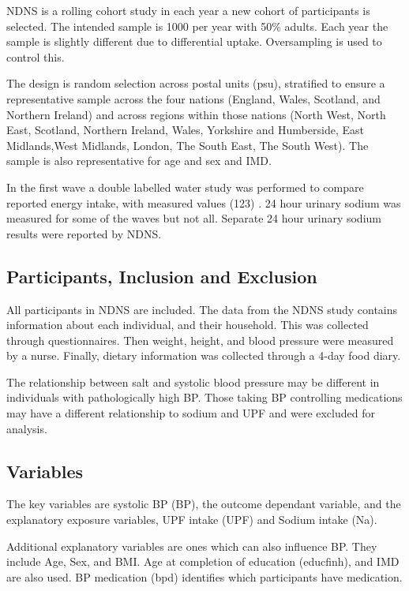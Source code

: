\documentclass[
]{article}
\begin{document}
NDNS is a rolling cohort study in each year a new cohort of participants
is selected. The intended sample is 1000 per year with 50\% adults. Each
year the sample is slightly different due to differential uptake.
Oversampling is used to control this.

The design is random selection across postal units (psu), stratified to
ensure a representative sample across the four nations (England, Wales,
Scotland, and Northern Ireland) and across regions within those nations
(North West, North East, Scotland, Northern Ireland, Wales, Yorkshire
and Humberside, East Midlands,West Midlands, London, The South East, The
South West). The sample is also representative for age and sex and IMD.

In the first wave a double labelled water study was performed to compare
reported energy intake, with measured values (123) . 24 hour urinary
sodium was measured for some of the waves but not all. Separate 24 hour
urinary sodium results were reported by NDNS.

\hypertarget{participants-inclusion-and-exclusion}{%
\subsection{Participants, Inclusion and
Exclusion}\label{participants-inclusion-and-exclusion}}

All participants in NDNS are included. The data from the NDNS study
contains information about each individual, and their household. This
was collected through questionnaires. Then weight, height, and blood
pressure were measured by a nurse. Finally, dietary information was
collected through a 4-day food diary.

The relationship between salt and systolic blood pressure may be
different in individuals with pathologically high BP. Those taking BP
controlling medications may have a different relationship to sodium and
UPF and were excluded for analysis.

\hypertarget{variables}{%
\subsection{Variables}\label{variables}}

The key variables are systolic BP (BP), the outcome dependant variable,
and the explanatory exposure variables, UPF intake (UPF) and Sodium
intake (Na).

Additional explanatory variables are ones which can also influence BP.
They include Age, Sex, and BMI. Age at completion of education
(educfinh), and IMD are also used. BP medication (bpd) identifies which
participants have medication.
\end{document}
